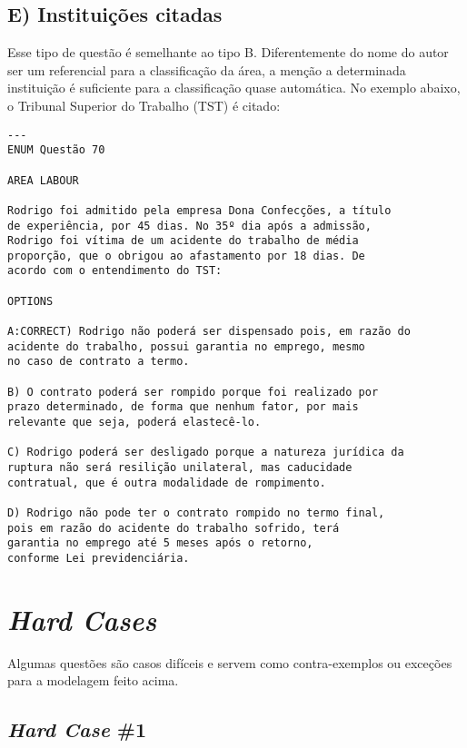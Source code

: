 \documentclass{article}
\begin{document}
\subsection*{E) Instituições citadas}

Esse tipo de questão é semelhante ao tipo B. Diferentemente do nome do autor ser um referencial para a classificação da área, a menção a determinada instituição é suficiente para a classificação quase automática. No exemplo abaixo, o Tribunal Superior do Trabalho (TST) é citado:

\begin{verbatim}
---
ENUM Questão 70 
     
AREA LABOUR
 
Rodrigo foi admitido pela empresa Dona Confecções, a título 
de experiência, por 45 dias. No 35º dia após a admissão, 
Rodrigo foi vítima de um acidente do trabalho de média 
proporção, que o obrigou ao afastamento por 18 dias. De 
acordo com o entendimento do TST: 
 
OPTIONS

A:CORRECT) Rodrigo não poderá ser dispensado pois, em razão do 
acidente do trabalho, possui garantia no emprego, mesmo 
no caso de contrato a termo.  

B) O contrato poderá ser rompido porque foi realizado por 
prazo determinado, de forma que nenhum fator, por mais 
relevante que seja, poderá elastecê-lo. 

C) Rodrigo poderá ser desligado porque a natureza jurídica da 
ruptura não será resilição unilateral, mas caducidade 
contratual, que é outra modalidade de rompimento. 

D) Rodrigo não pode ter o contrato rompido no termo final, 
pois em razão do acidente do trabalho sofrido, terá 
garantia no emprego até 5 meses após o retorno, 
conforme Lei previdenciária. 
\end{verbatim}

\section*{\textit{Hard Cases}}

Algumas questões são casos difíceis e servem como contra-exemplos ou exceções para a modelagem feito acima. 


\subsection*{\textit{Hard Case} \#1}
\end{document}

